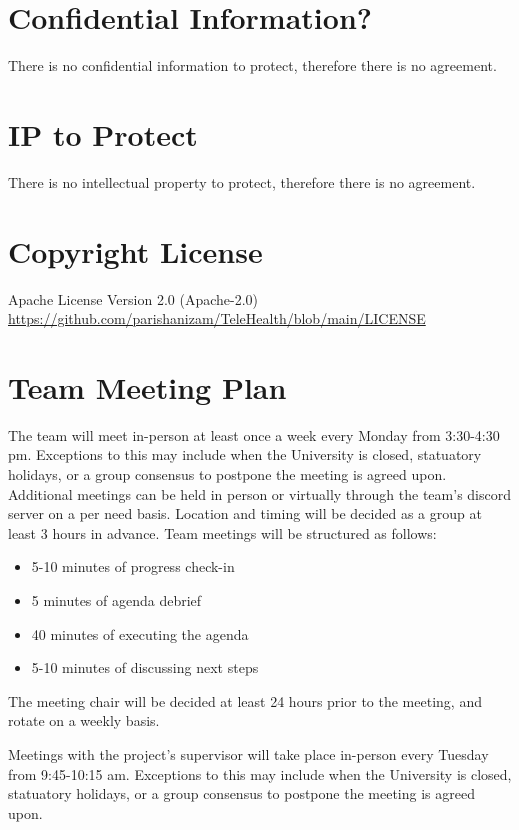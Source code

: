 \documentclass{article}
\begin{document}
\section{Confidential Information?}

There is no confidential information to protect, therefore there is no agreement.

\section{IP to Protect}

There is no intellectual property to protect, therefore there is no agreement.

\section{Copyright License}

Apache License Version 2.0 (Apache-2.0) \\
\url{https://github.com/parishanizam/TeleHealth/blob/main/LICENSE}

\section{Team Meeting Plan}

The team will meet in-person at least once a week every Monday from 3:30-4:30 pm. Exceptions to this 
may include when the University is closed, statuatory holidays, or a group consensus to postpone the meeting
is agreed upon. Additional meetings can be held in person or virtually through the team's discord server on 
a per need basis. Location and timing will be decided as a group at least 3 hours in advance. Team meetings will
be structured as follows:
\begin{itemize}
  \item 5-10 minutes of progress check-in 
  \item 5 minutes of agenda debrief
  \item 40 minutes of executing the agenda
  \item 5-10 minutes of discussing next steps
\end{itemize}
\indent The meeting chair will be decided at least 24 hours prior to the meeting, and rotate on a weekly basis.

Meetings with the project's supervisor will take place in-person every Tuesday from 9:45-10:15 am. Exceptions 
to this may include when the University is closed, statuatory holidays, or a group consensus to postpone the 
meeting is agreed upon.
\end{document}
